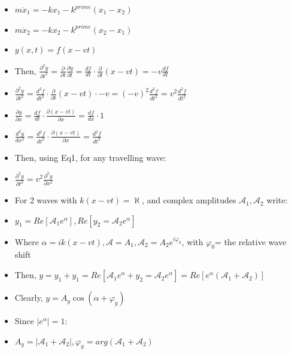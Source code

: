 \documentclass{article}
\begin{document}
\begin{itemize}
    \item \(m\ddot x_1 = -kx_1 - k^{prime}(x_1-x_2)\)
    \item \(m\ddot x_2 = -kx_2 - k^{prime}(x_2-x_1)\)
\end{itemize}

\begin{itemize}
    \item \(y(x, t)=f(x-vt)\)
    \item Then, \(\frac{\partial^2 y}{\partial t^2}=\frac{\partial}{\partial t}\frac{\partial y}{\partial t}=\frac{df}{dt}\cdot \frac{\partial}{\partial t}(x-vt)=-v\frac{df}{dt}\)
    \item \(\frac{\partial^2 y}{\partial t^2}=\frac{d^2 f}{dt^2}\cdot\frac{\partial}{\partial t}(x-vt)\cdot -v=(-v)^2\frac{d^2f}{dt^2}=v^2\frac{d^2f}{dt^2}\)
    \item \(\frac{\partial y}{\partial x}=\frac{df}{dt}\cdot \frac{\partial (x-vt)}{\partial x}=\frac{df}{dx}\cdot 1\)
    \item \(\frac{d^2y}{dx^2}=\frac{d^2f}{dt^2}\cdot \frac{\partial (x-vt)}{\partial x}=\frac{d^2f}{dt^2}\)
    \item Then, using Eq1, for any travelling wave:
    \item \(\boxed{\frac{\partial^2 y}{\partial t^2}=v^2\frac{\partial^2 y}{\partial x^2}}\) 
    
\end{itemize}

\begin{itemize}
    \item For 2 waves with \(k(x-vt)=\aleph\), and complex amplitudes \(\mathcal{A}_1, \mathcal{A}_2\) write:
    \item \(y_1=Re[\mathcal{A}_1e^{\alpha}], Re[y_2=\mathcal{A}_2e^{\alpha}]\)
    \item Where \(\alpha =ik(x-vt), \mathcal{A}=A_1, \mathcal{A}_2=A_2e^{i\varphi_0}\), with \(\varphi_0\)= the relative wave shift
    \item Then, \(y=y_1+y_1=Re[\mathcal{A}_1e^{\alpha}+y_2=\mathcal{A}_2e^{\alpha}]=Re[e^{\alpha}(\mathcal{A}_1+\mathcal{A}_2)]\)
    \item Clearly, \(y=A_y\cos(\alpha+\varphi_y)\)
    \item Since \(|e^{\alpha}|=1\):
    \item \(\boxed{A_y=|\mathcal{A}_1+\mathcal{A}_2|, \varphi_y=arg(\mathcal{A}_1+\mathcal{A}_2)}\)
\end{itemize}
\end{document}
